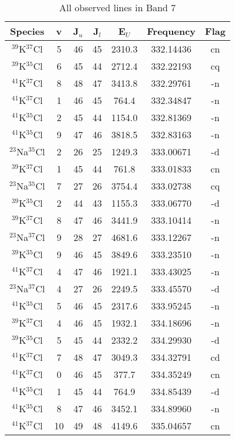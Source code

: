 \begin{table*}[htp]
\centering
\caption{All observed lines in Band 7}
\begin{tabular}{ccccccc}
\label{tab:all_detections_B7}
Species & v & J$_u$ & J$_l$ & E$_U$ & Frequency & Flag \\
\hline
$^{39}$K$^{37}$Cl & 5 & 46 & 45 & 2310.3 & 332.14436 & cn \\
$^{39}$K$^{35}$Cl & 6 & 45 & 44 & 2712.4 & 332.22193 & cq \\
$^{41}$K$^{37}$Cl & 8 & 48 & 47 & 3413.8 & 332.29761 & -n \\
$^{41}$K$^{37}$Cl & 1 & 46 & 45 & 764.4 & 332.34847 & -n \\
$^{41}$K$^{35}$Cl & 2 & 45 & 44 & 1154.0 & 332.81369 & -n \\
$^{41}$K$^{35}$Cl & 9 & 47 & 46 & 3818.5 & 332.83163 & -n \\
$^{23}$Na$^{35}$Cl & 2 & 26 & 25 & 1249.3 & 333.00671 & -d \\
$^{39}$K$^{37}$Cl & 1 & 45 & 44 & 761.8 & 333.01833 & cn \\
$^{23}$Na$^{35}$Cl & 7 & 27 & 26 & 3754.4 & 333.02738 & cq \\
$^{39}$K$^{35}$Cl & 2 & 44 & 43 & 1155.3 & 333.06770 & -d \\
$^{39}$K$^{37}$Cl & 8 & 47 & 46 & 3441.9 & 333.10414 & -n \\
$^{23}$Na$^{37}$Cl & 9 & 28 & 27 & 4681.6 & 333.12267 & -n \\
$^{39}$K$^{35}$Cl & 9 & 46 & 45 & 3849.6 & 333.23510 & -n \\
$^{41}$K$^{37}$Cl & 4 & 47 & 46 & 1921.1 & 333.43025 & -n \\
$^{23}$Na$^{37}$Cl & 4 & 27 & 26 & 2249.5 & 333.45570 & -d \\
$^{41}$K$^{35}$Cl & 5 & 46 & 45 & 2317.6 & 333.95245 & -n \\
$^{39}$K$^{37}$Cl & 4 & 46 & 45 & 1932.1 & 334.18696 & -n \\
$^{39}$K$^{35}$Cl & 5 & 45 & 44 & 2332.2 & 334.29930 & -d \\
$^{41}$K$^{37}$Cl & 7 & 48 & 47 & 3049.3 & 334.32791 & cd \\
$^{41}$K$^{37}$Cl & 0 & 46 & 45 & 377.7 & 334.35249 & cn \\
$^{41}$K$^{35}$Cl & 1 & 45 & 44 & 764.9 & 334.85439 & -d \\
$^{41}$K$^{35}$Cl & 8 & 47 & 46 & 3452.1 & 334.89960 & -n \\
$^{41}$K$^{37}$Cl & 10 & 49 & 48 & 4149.6 & 335.04657 & cn \\

\end{tabular}
\end{table*}
